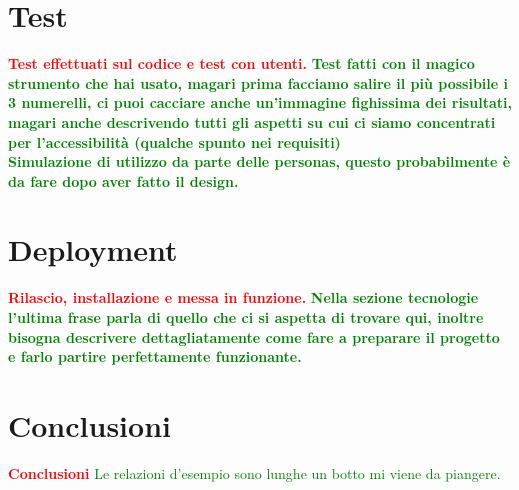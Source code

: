 \documentclass{article}
\begin{document}
\section{Test}
\textcolor{red}{\textbf{Test effettuati sul codice e test con utenti.}}
\textcolor{green}{\textbf{Test fatti con il magico strumento che hai usato, magari prima facciamo salire il più possibile i 3 numerelli, ci puoi cacciare anche un'immagine fighissima dei risultati, magari anche descrivendo tutti gli aspetti su cui ci siamo concentrati per l'accessibilità (qualche spunto nei requisiti)\\Simulazione di utilizzo da parte delle personas, questo probabilmente è da fare dopo aver fatto il design.}}

\section{Deployment}\label{sec:deploy}
\textcolor{red}{\textbf{Rilascio, installazione e messa in funzione.}}
\textcolor{green}{\textbf{Nella sezione tecnologie l'ultima frase parla di quello che ci si aspetta di trovare qui, inoltre bisogna descrivere dettagliatamente come fare a preparare il progetto e farlo partire perfettamente funzionante.}}

\section{Conclusioni}
\textcolor{red}{\textbf{Conclusioni}}
\textcolor{green}{Le relazioni d'esempio sono lunghe un botto mi viene da piangere.}



\end{document}
